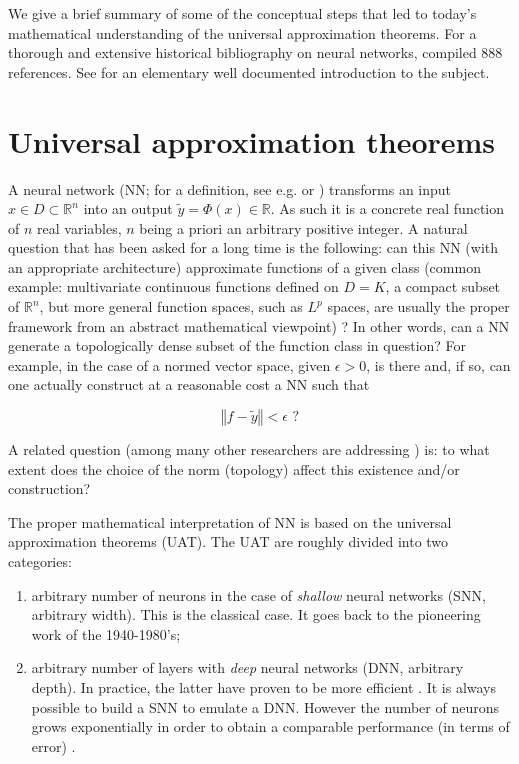 We give a brief summary of some of the conceptual steps that led to today's mathematical understanding of the universal approximation theorems. For a thorough and extensive historical bibliography on neural networks, \cite{schmidhuber2015deep} compiled 888 references. See \cite{goodfellow2016deep} for an elementary well documented introduction to the subject.

\section{Universal approximation theorems}

A neural network (NN; for a definition, see e.g. \cite{pinkus1999approximation} or \cite{calin2020deep}) transforms an input $x\in D\subset\mathbb{R}^{n}$ into an output $\widetilde{y}=\Phi\left(  x\right)  \in\mathbb{R}$. As such it is a concrete real function of $n$ real variables, $n$ being a priori an arbitrary positive integer. A natural question that has been asked for a long time is the following: can this NN (with an appropriate architecture) approximate functions of a given class (common example: multivariate continuous functions defined on $D=K$, a compact subset of $\mathbb{R}^{n}$, but more general function spaces, such as $L^{p}$ spaces, are usually the proper framework from an abstract mathematical viewpoint) \citep{mhaskar1996system}? In other words, can a NN generate a topologically dense subset of the function class in question? For example, in the case of a normed vector space, given $\epsilon>0$, is there and, if so, can one actually construct at a reasonable cost a NN such that

\[
\left\Vert f-\widetilde{y}\right\Vert <\epsilon\text{ ?}%
\]

A related question (among many other researchers are addressing \citep{fan2020universal}) is: to what extent does the choice of the norm (topology) affect this existence and/or construction?

The proper mathematical interpretation of NN is based on the universal
approximation theorems (UAT). The UAT are roughly divided into two categories:

\begin{enumerate}
\item arbitrary number of neurons in the case of {\it shallow} neural networks (SNN, arbitrary width). This is the classical case. It goes back to the pioneering work of the 1940-1980's;

\item arbitrary number of layers with {\it deep} neural networks (DNN, arbitrary
depth). In practice, the latter have proven to be more efficient
\citep{mhaskar2019function}. It is always possible to build a SNN to emulate a DNN. However the number of neurons grows exponentially in order to obtain a
comparable performance (in terms of error) \citep{telgarsky2016benefits,eldan2016power}.
\end{enumerate}

